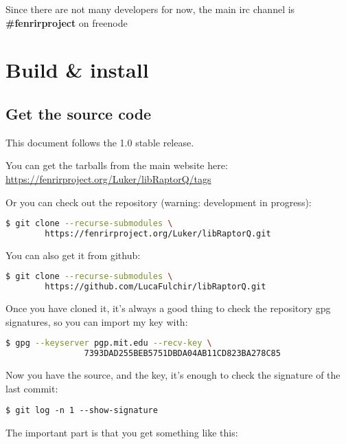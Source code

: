 \documentclass[11pt,a4paper]{refart}
\begin{document}
 Since there are not many developers for now, the main irc channel is \textbf{\#fenrirproject} on freenode


\section{Build \& install}
\subsection{Get the source code}
This document follows the 1.0 stable release.

You can get the tarballs from the main website here:\\
\href{https://fenrirproject.org/Luker/libRaptorQ/tags}{https://fenrirproject.org/Luker/libRaptorQ/tags}

Or you can check out the repository (warning: development in progress):

\begin{lstlisting}[language=bash,breaklines=true]
$ git clone --recurse-submodules \
		https://fenrirproject.org/Luker/libRaptorQ.git
\end{lstlisting}

You can also get it from github:

\begin{lstlisting}[language=bash,breaklines=true]
$ git clone --recurse-submodules \
		https://github.com/LucaFulchir/libRaptorQ.git
\end{lstlisting}

Once you have cloned it, it's always a good thing to check the repository gpg
signatures, so you can import my key with:

\begin{lstlisting}[language=bash,breaklines=true]
$ gpg --keyserver pgp.mit.edu --recv-key \
				7393DAD255BEB5751DBDA04AB11CD823BA278C85
\end{lstlisting}


Now you have the source, and the key, it's enough to check the signature of the
last commit:

\begin{verbatim}
$ git log -n 1 --show-signature
\end{verbatim}

The important part is that you get something like this:
\end{document}
